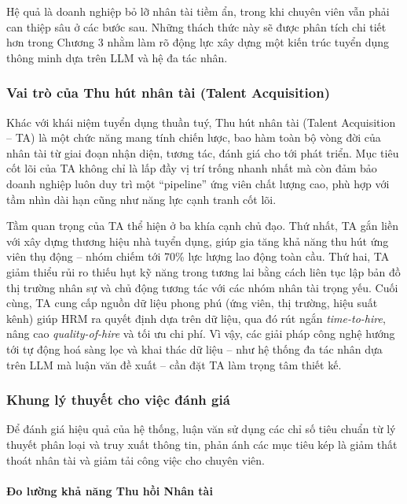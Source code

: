 \documentclass{article}
\begin{document}
Hệ quả là doanh nghiệp bỏ lỡ nhân tài tiềm ẩn, trong khi chuyên viên vẫn phải can thiệp sâu ở các bước sau. Những thách thức này sẽ được phân tích chi tiết hơn trong Chương 3 nhằm làm rõ động lực xây dựng một kiến trúc tuyển dụng thông minh dựa trên LLM và hệ đa tác nhân.

\subsubsection{Vai trò của Thu hút nhân tài (Talent Acquisition)}
Khác với khái niệm tuyển dụng thuần tuý, Thu hút nhân tài (Talent Acquisition – TA) là một chức năng mang tính chiến lược, bao hàm toàn bộ vòng đời của nhân tài từ giai đoạn nhận diện, tương tác, đánh giá cho tới phát triển. Mục tiêu cốt lõi của TA không chỉ là lấp đầy vị trí trống nhanh nhất mà còn đảm bảo doanh nghiệp luôn duy trì một “pipeline” ứng viên chất lượng cao, phù hợp với tầm nhìn dài hạn cũng như năng lực cạnh tranh cốt lõi.

Tầm quan trọng của TA thể hiện ở ba khía cạnh chủ đạo. Thứ nhất, TA gắn liền với xây dựng thương hiệu nhà tuyển dụng, giúp gia tăng khả năng thu hút ứng viên thụ động – nhóm chiếm tới 70\% lực lượng lao động toàn cầu. Thứ hai, TA giảm thiểu rủi ro thiếu hụt kỹ năng trong tương lai bằng cách liên tục lập bản đồ thị trường nhân sự và chủ động tương tác với các nhóm nhân tài trọng yếu. Cuối cùng, TA cung cấp nguồn dữ liệu phong phú (ứng viên, thị trường, hiệu suất kênh) giúp HRM ra quyết định dựa trên dữ liệu, qua đó rút ngắn \textit{time-to-hire}, nâng cao \textit{quality-of-hire} và tối ưu chi phí. Vì vậy, các giải pháp công nghệ hướng tới tự động hoá sàng lọc và khai thác dữ liệu – như hệ thống đa tác nhân dựa trên LLM mà luận văn đề xuất – cần đặt TA làm trọng tâm thiết kế.

\subsubsection{Khung lý thuyết cho việc đánh giá}
Để đánh giá hiệu quả của hệ thống, luận văn sử dụng các chỉ số tiêu chuẩn từ lý thuyết phân loại và truy xuất thông tin, phản ánh các mục tiêu kép là giảm thất thoát nhân tài và giảm tải công việc cho chuyên viên.

\paragraph{Đo lường khả năng Thu hồi Nhân tài}
\end{document}
